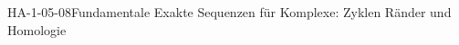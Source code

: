 
\begin{EXA}{HA-1-05-08}{Fundamentale Exakte Sequenzen für Komplexe: Zyklen Ränder und Homologie}
\end{EXA}
